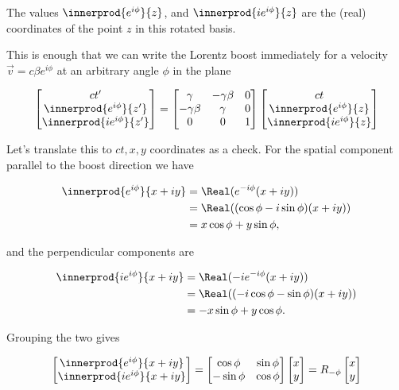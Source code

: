 The values $\innerprod{e^{i \phi}}{z}$, and $\innerprod{i e^{i\phi} }{z}$ are the (real) coordinates of the point $z$ in this rotated basis.

This is enough that we can write the Lorentz boost immediately for a velocity $\vec{v} = c \beta e^{i\phi}$ at an arbitrary angle $\phi$ in the plane

\begin{equation}\label{eqn:complexPlanarBoost:170}
\begin{bmatrix}
ct' \\
\innerprod{e^{i\phi}}{z'} \\
\innerprod{i e^{i\phi}}{z'} 
\end{bmatrix}
=
\begin{bmatrix}
\gamma & -\gamma \beta & 0 \\
-\gamma \beta & \gamma & 0 \\
0 & 0 & 1
\end{bmatrix}
\begin{bmatrix}
ct \\
\innerprod{e^{i\phi}}{z} \\
\innerprod{i e^{i\phi}}{z} 
\end{bmatrix}
\end{equation}

Let's translate this to $ct, x, y$ coordinates as a check.  For the spatial component parallel to the boost direction we have

\begin{align*}
\innerprod{e^{i\phi}}{x + iy} 
&= 
\Real ( e^{-i\phi} (x + i y) ) \\
&= 
\Real ( (\cos\phi - i \sin\phi)(x + i y) ) \\
&= 
x \cos\phi + y \sin\phi,
\end{align*}

and the perpendicular components are

\begin{align*}
\innerprod{ i e^{i\phi}}{x + iy} 
&= 
\Real ( -i e^{-i\phi} (x + i y) ) \\
&= 
\Real ( (-i \cos\phi - \sin\phi)(x + i y) ) \\
&= 
-x \sin\phi + y \cos\phi.
\end{align*}

Grouping the two gives

\begin{equation}\label{eqn:complexPlanarBoost:200}
\begin{bmatrix}
\innerprod{e^{i\phi}}{x + iy}  \\
\innerprod{i e^{i\phi}}{x + iy} 
\end{bmatrix}
=
\begin{bmatrix}
\cos\phi & \sin\phi \\
-\sin\phi & \cos\phi
\end{bmatrix}
\begin{bmatrix}
x \\
y
\end{bmatrix}
= R_{-\phi}
\begin{bmatrix}
x \\
y
\end{bmatrix}
\end{equation}

